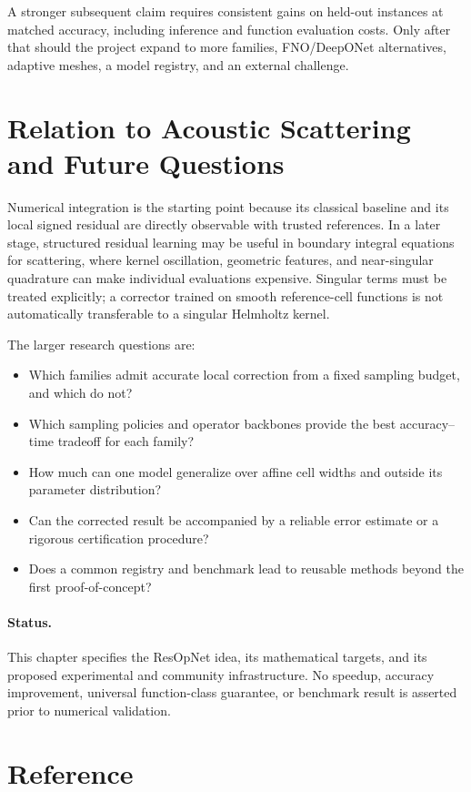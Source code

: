 A stronger subsequent claim requires consistent gains on held-out
instances at matched accuracy, including inference and function
evaluation costs. Only after that should the project expand to
more families, FNO/DeepONet alternatives, adaptive meshes, a model
registry, and an external challenge.

\section{Relation to Acoustic Scattering and Future Questions}
\label{sec:resop-outlook}

Numerical integration is the starting point because its classical
baseline and its local signed residual are directly observable with
trusted references. In a later stage, structured residual learning may
be useful in boundary integral equations for scattering, where kernel
oscillation, geometric features, and near-singular quadrature can make
individual evaluations expensive. Singular terms must be treated
explicitly; a corrector trained on smooth reference-cell functions is
not automatically transferable to a singular Helmholtz kernel.

The larger research questions are:
\begin{itemize}
    \item Which families admit accurate local correction from a fixed
          sampling budget, and which do not?
    \item Which sampling policies and operator backbones provide the
          best accuracy--time tradeoff for each family?
    \item How much can one model generalize over affine cell widths and
          outside its parameter distribution?
    \item Can the corrected result be accompanied by a reliable
          error estimate or a rigorous certification procedure?
    \item Does a common registry and benchmark lead to reusable methods
          beyond the first proof-of-concept?
\end{itemize}

\paragraph{Status.}
This chapter specifies the ResOpNet idea, its mathematical targets, and
its proposed experimental and community infrastructure. No speedup,
accuracy improvement, universal function-class guarantee, or benchmark
result is asserted prior to numerical validation.




\section{Reference}
